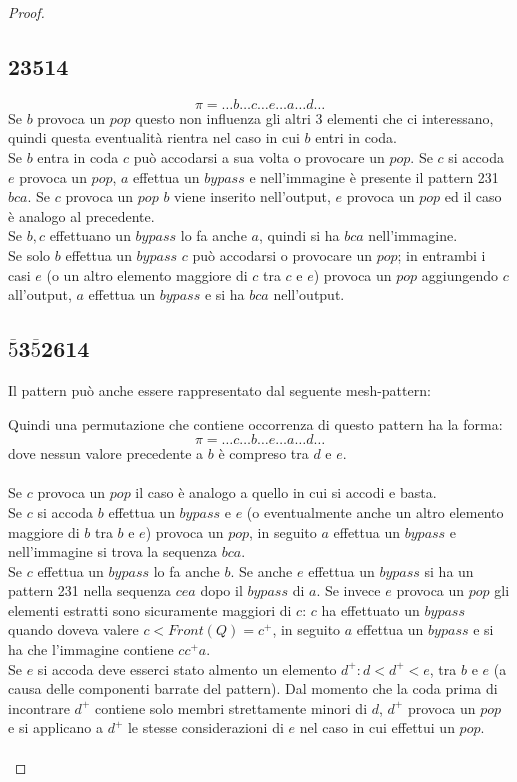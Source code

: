 \documentclass[10pt,a4paper]{article}
\begin{document}
\begin{proof}
\subsection*{23514}$$\pi = \dots{b}\dots{c}\dots{e}\dots{a}\dots{d}\dots$$Se $b$ provoca un $pop$ questo non influenza gli altri 3 elementi che ci interessano, quindi questa eventualità rientra nel caso in cui $b$ entri in coda.\\
Se $b$ entra in coda $c$ può accodarsi a sua volta o provocare un $pop$. Se $c$ si accoda $e$ provoca un $pop$, $a$ effettua un $bypass$ e nell'immagine è presente il pattern 231 $bca$. Se $c$ provoca un $pop$ $b$ viene inserito nell'output, $e$ provoca un $pop$ ed il caso è analogo al precedente.\\
Se $b, c$ effettuano un $bypass$ lo fa anche $a$, quindi si ha $bca$ nell'immagine.\\
Se solo $b$ effettua un $bypass$ $c$ può accodarsi o provocare un $pop$; in entrambi i casi $e$ (o un altro elemento maggiore di $c$ tra $c$ e $e$) provoca un $pop$ aggiungendo $c$ all'output, $a$ effettua un $bypass$ e si ha $bca$ nell'output.
\subsection*{$\overline{5}$3$\overline{5}$2614}
Il pattern può anche essere rappresentato dal seguente mesh-pattern:
\begin{center}
\end{center}
Quindi una permutazione che contiene occorrenza di questo pattern ha la forma:
$$\pi = \dots{c}\dots{b}\dots{e}\dots{a}\dots{d}\dots$$dove nessun valore precedente a $b$ è compreso tra $d$ e $e$.\\\\
Se $c$ provoca un $pop$ il caso è analogo a quello in cui si accodi e basta.\\
Se $c$ si accoda $b$ effettua un $bypass$ e $e$ (o eventualmente anche un altro elemento maggiore di $b$ tra $b$ e $e$) provoca un $pop$, in seguito $a$ effettua un $bypass$ e nell'immagine si trova la sequenza $bca$.\\
Se $c$ effettua un $bypass$ lo fa anche $b$. Se anche $e$ effettua un $bypass$ si ha un pattern 231 nella sequenza $cea$ dopo il $bypass$ di $a$. Se invece $e$ provoca un $pop$ gli elementi estratti sono sicuramente maggiori di $c$: $c$ ha effettuato un $bypass$ quando doveva valere $c<Front(Q)=c^+$, in seguito $a$ effettua un $bypass$ e si ha che l'immagine contiene $cc^+a$.\\
Se $e$ si accoda deve esserci stato almento un elemento $d^+:d<d^+<e$, tra $b$ e $e$ (a causa delle componenti barrate del pattern). Dal momento che la coda prima di incontrare $d^+$ contiene solo membri strettamente minori di $d$, $d^+$ provoca un $pop$ e si applicano a $d^+$ le stesse considerazioni di $e$ nel caso in cui effettui un $pop$.\\\\
\end{proof}
\end{document}
